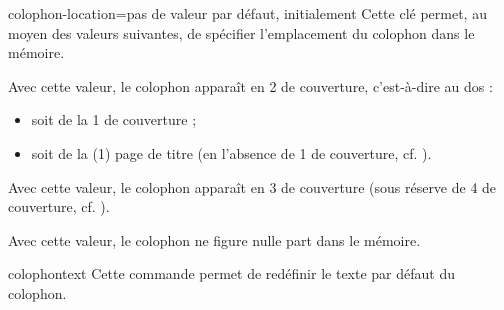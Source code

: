{
  \begin{docKey}[][doc
    new=2020-03-26]{colophon-location}{=\textbar{}\textbar{}}{pas
      de valeur par défaut, initialement }
    Cette clé permet, au moyen des valeurs suivantes, de spécifier l'emplacement
    du colophon dans le mémoire.
  \begin{description}
  \item[\docValue{verso-frontcover}.]%
    Avec cette valeur, le colophon apparaît en 2\ieme{} de couverture,
    c'est-à-dire au dos :
    \begin{itemize}
    \item soit de la 1\iere{} de couverture ;
    \item soit de la (1\iere{}) page de titre (en l'absence de 1\iere{} de
      couverture, cf. ).
    \end{itemize}
  \item[\docValue{recto-backcover}.]%
    Avec cette valeur, le colophon apparaît en 3\ieme{} de couverture (sous
    réserve de 4\ieme{} de couverture, cf. ).
  \item[\docValue{nowhere}.]%
    Avec cette valeur, le colophon ne figure nulle part dans le mémoire.
  \end{description}
\end{docKey}
}

\begin{docCommand}[doc new=2020-03-26]{colophontext}{}
  Cette commande permet de redéfinir le texte par défaut du colophon.
\end{docCommand}

